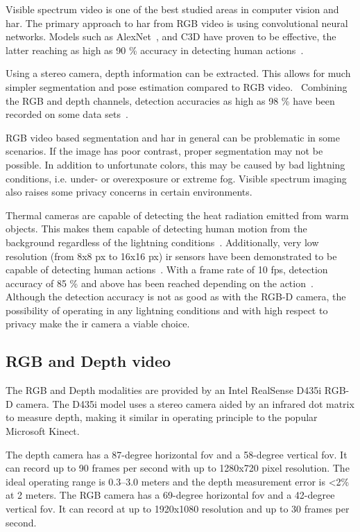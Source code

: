Visible spectrum video is one of the best studied areas in computer vision and \gls{har}.
The primary approach to \gls{har} from RGB video is using convolutional neural networks.
Models such as AlexNet~\cite{alexnet}, and C3D have proven to be effective,
the latter reaching as high as 90 \% accuracy in detecting human actions~\cite{c3d}. 

Using a stereo camera, depth information can be extracted.
This allows for much simpler segmentation and pose estimation
compared to RGB video.~\cite{sensing-survey}
Combining the RGB and depth channels,
detection accuracies as high as 98 \% have been recorded on some data sets~\cite{cippitelli16}.

RGB video based segmentation and \gls{har} in general can be problematic in some scenarios.
If the image has poor contrast, proper segmentation may not be possible.
In addition to unfortunate colors,
this may be caused by bad lightning conditions, i.e. under- or overexposure or extreme fog.
Visible spectrum imaging also raises some privacy concerns in certain environments.

Thermal cameras are capable of detecting the heat radiation emitted from warm objects.
This makes them capable of detecting human motion from the background regardless of the lightning conditions~\cite{han05}.
Additionally, very low resolution (from 8x8 px to 16x16 px) \gls{ir} sensors
have been demonstrated to be capable of detecting human actions~\cite{10.1145/2632048.2636084}.
With a frame rate of 10 fps, detection accuracy of 85 \% and above has been reached depending on the action~\cite{sensing-survey, tao18}.
Although the detection accuracy is not as good as with the RGB-D camera,
the possibility of operating in any lightning conditions and with high respect to privacy
make the \gls{ir} camera a viable choice.

\subsection{RGB and Depth video}
The RGB and Depth modalities are provided by an Intel RealSense D435i RGB-D camera.
The D435i model uses a stereo camera aided by an infrared dot matrix to measure depth,
making it similar in operating principle to the popular Microsoft Kinect.

The depth camera has a 87-degree horizontal \gls{fov} and a 58-degree vertical \gls{fov}.
It can record up to 90 frames per second with up to 1280x720 pixel resolution.
The ideal operating range is 0.3--3.0 meters and the depth measurement error is <2\% at 2 meters.
The RGB camera has a 69-degree horizontal \gls{fov} and a 42-degree vertical \gls{fov}.
It can record at up to 1920x1080 resolution and up to 30 frames per second.~\cite{realsense-datasheet}

